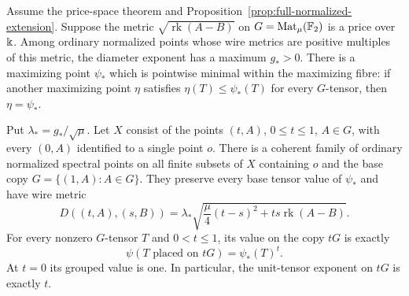 \begin{theorem}
\label{thm:radial-full-homogeneity}
Assume the price-space theorem and
Proposition~\ref{prop:full-normalized-extension}. Suppose the metric
$\sqrt{\operatorname{rk}(A-B)}$ on
$G=\operatorname{Mat}_{\mu}(\mathbb F_2)$ is a price over $\Bbbk$.
Among ordinary normalized points whose wire metrics are positive
multiples of this metric, the diameter exponent has a maximum
$g_*>0$. There is a maximizing point $\psi_*$ which is pointwise
minimal within the maximizing fibre: if another maximizing point
$\eta$ satisfies $\eta(T)\le\psi_*(T)$ for every $G$-tensor,
then $\eta=\psi_*$.

Put $\lambda_*=g_*/\sqrt\mu$. Let $X$ consist of the points
$(t,A)$, $0\le t\le1$, $A\in G$, with every $(0,A)$ identified
to a single point $o$. There is a coherent family of ordinary
normalized spectral points on all finite subsets of $X$ containing
$o$ and the base copy $G=\{(1,A):A\in G\}$. They preserve every
base tensor value of $\psi_*$ and have wire metric
\[
 D((t,A),(s,B))
 =\lambda_*\sqrt{\frac\mu4(t-s)^2+ts\operatorname{rk}(A-B)}.
\]
For every nonzero $G$-tensor $T$ and $0<t\le1$, its value on the
copy $tG$ is exactly
\begin{equation}\label{eq:radial-full-homogeneity}
 \psi(T\text{ placed on }tG)=\psi_*(T)^t.
\end{equation}
At $t=0$ its grouped value is one. In particular, the unit-tensor
exponent on $tG$ is exactly $t$.
\end{theorem}

